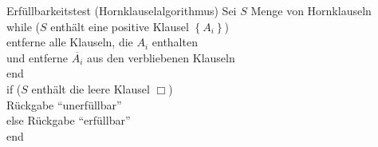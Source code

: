 \begin{frame}{Erfüllbarkeitstest (Hornklauselalgorithmus)}
	Sei $S$ Menge von Hornklauseln\\
	while ($S$ enthält eine positive Klausel $\left\{A_i\right\}$)\\
	\qquad entferne alle Klauseln, die $A_i$ enthalten\\
	\qquad und entferne $\overline{A_i}$ aus den verbliebenen Klauseln\\
	end\\
	if ($S$ enthält die leere Klausel $\Box$)\\
	\qquad Rückgabe "`unerfüllbar"'\\
	else Rückgabe "`erfüllbar"'\\
	end
\end{frame}

